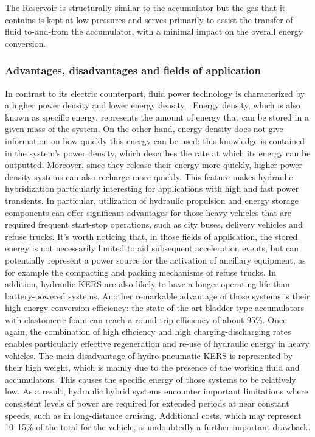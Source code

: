 \documentclass[11pt]{article}
\begin{document}
The Reservoir is structurally similar to the accumulator but the gas that it contains is kept at low pressures and serves primarily to assist the transfer of fluid to-and-from the accumulator, with a minimal impact on the overall energy conversion. 

\subsubsection{Advantages, disadvantages and fields of application}

In contrast to its electric counterpart, fluid power technology is characterized by a higher power density and lower energy density \cite{f}. Energy density, which is also known as specific energy, represents the amount of energy that can be stored in a given mass of the system. On the other hand, energy density does not give information on how quickly this energy can be used: this knowledge is contained in the system's power density, which describes the rate at which its energy can be outputted. Moreover, since they release their energy more quickly, higher power density systems can also recharge more quickly. This feature makes hydraulic hybridization particularly interesting for applications with high and fast power transients.  In particular, utilization of hydraulic propulsion and energy storage components can offer significant advantages for those heavy vehicles that are required frequent start-stop operations, such as city buses, delivery vehicles and refuse trucks. It’s worth noticing that, in those fields of application, the stored energy is not necessarily limited to aid subsequent acceleration events, but can potentially represent a power source for the activation of ancillary equipment, as for example the compacting and packing mechanisms of refuse trucks. In addition, hydraulic KERS are also likely to have a longer operating life than battery-powered systems.  Another remarkable advantage of those systems is their high energy conversion efficiency: the state-of-the art bladder type accumulators with elastomeric foam can reach a round-trip efficiency of about 95\%. Once again, the combination of high efficiency and high charging-discharging rates enables particularly effective regeneration and re-use of hydraulic energy in heavy vehicles.
The main disadvantage of hydro-pneumatic KERS is represented by their high weight, which is mainly due to the presence of the working fluid and accumulators. This causes the specific energy of those systems to be relatively low. As a result, hydraulic hybrid systems encounter important limitations where consistent levels of power are required for extended periods at near constant speeds, such as in long-distance cruising.
Additional costs, which may represent 10–15\% of the total for the vehicle, is undoubtedly a further important drawback.
\end{document}
